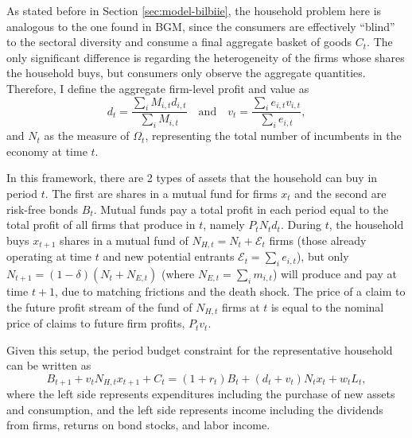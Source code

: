\documentclass[a4paper,12pt]{article} %
\numberwithin{equation}{section} %
\numberwithin{figure}{section}
\numberwithin{table}{section}
\begin{document}
As stated before in Section \ref{sec:model-bilbiie}, the household problem here is analogous to the one found in BGM, since the consumers are
effectively ``blind'' to the sectoral diversity and consume a final aggregate basket of goods $C_t$. The only significant difference is regarding
the heterogeneity of the firms whose shares the household buys, but consumers only observe the aggregate quantities. Therefore, I define the aggregate
firm-level profit and value as 
$$
    d_{t} = \frac{\sum_iM_{i,t}d_{i,t}}{\sum_iM_{i,t}} \quad \text{and} \quad v_{t} = \frac{\sum_ie_{i,t}v_{i,t}}{\sum_ie_{i,t}},
$$
and $N_t$ as the measure of $\Omega_t$, representing the total number of incumbents in the economy at time $t$.

In this framework, there are 
2 types of assets that the household can buy in period $t$. The first are shares in a mutual fund for firms $x_t$ and the second are 
risk-free bonds $B_t$. Mutual funds pay a total profit in each period equal to the total profit of all firms that produce in $t$, namely $P_tN_td_t$. 
During $t$, the household buys $x_{t+1}$ shares in a mutual fund of $N_{H,t} = N_t + \mathcal{E}_{t}$ firms (those already operating at 
time $t$ and new potential entrants $\mathcal{E}_t = \sum_ie_{i,t}$), but only $N_{t+1} = (1-\delta)(N_t +N_{E,t})$ (where $N_{E,t} = 
\sum_im_{i,t}$) will produce and pay at time $t+1$, due to matching frictions and the death shock. The price of a claim to the 
future profit stream of the fund of $N_{H,t}$ firms at $t$ is equal to the nominal price of claims to future firm profits, $P_tv_t$.

Given this setup, the period budget constraint for the representative household can be written as
$$B_{t+1} + v_t N_{H,t} x_{t+1} + C_t = (1 + r_t) B_t + (d_t + v_t) N_t x_t + w_t L_t,$$
where the left side represents expenditures including the purchase of new assets and consumption, and the left side represents income
including the dividends from firms, returns on bond stocks, and labor income.
\end{document}
